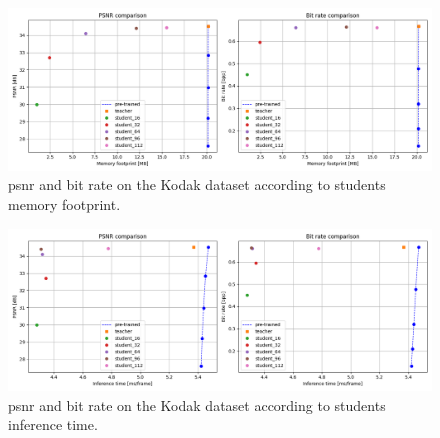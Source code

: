 \documentclass{article}
\begin{document}
\begin{figure}
  \centering
  \includegraphics[width=15cm]{kd_lic_memory.png}
  \caption[\acrshort{psnr} and bit rate on the Kodak dataset according to students memory footprint.]{\acrshort{psnr} and bit rate on the Kodak dataset according to students memory footprint.}
  \label{appendix:kd_lic_memory}
\end{figure}

\begin{figure}
  \centering
  \includegraphics[width=15cm]{kd_lic_time.png}
  \caption[\acrshort{psnr} and bit rate on the Kodak dataset according to students inference time.]{\acrshort{psnr} and bit rate on the Kodak dataset according to students inference time.}
  \label{appendix:kd_lic_time}
\end{figure}
\end{document}

